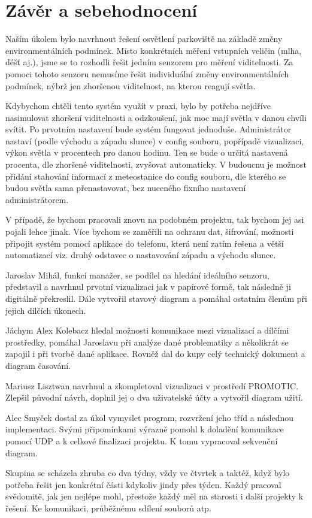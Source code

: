 \chapter{Závěr a sebehodnocení}

Naším úkolem bylo navrhnout řešení osvětlení parkoviště na základě změny environmentálních podmínek. Místo konkrétních měření vstupních veličin (mlha, déšť aj.), jsme se to rozhodli řešit jedním senzorem pro měření viditelnosti. Za pomoci tohoto senzoru nemusíme řešit individuální změny environmentálních podmínek, nýbrž jen zhoršenou viditelnost, na kterou reagují světla. 

Kdybychom chtěli tento systém využít v praxi, bylo by potřeba nejdříve nasimulovat zhoršení viditelnosti a odzkoušení, jak moc mají světla v danou chvíli svítit. Po prvotním nastavení bude systém fungovat jednoduše. Administrátor nastaví (podle východu a západu slunce) v config souboru, popřípadě vizualizaci, výkon světla v procentech pro danou hodinu. Ten se bude o určitá nastavená procenta, dle zhoršené viditelnosti, zvyšovat automaticky. V budoucnu je možnost přidání stahování informací z meteostanice do config souboru, dle kterého se budou světla sama přenastavovat, bez nuceného fixního nastavení administrátorem.

V případě, že bychom pracovali znovu na podobném projektu, tak bychom jej asi pojali lehce jinak. Více bychom se zaměřili na ochranu dat, šifrování, možnosti připojit systém pomocí aplikace do telefonu, která není zatím řešena a větší automatizací viz. druhý odstavec o nastavování západu a východu slunce. 

Jaroslav Mihál, funkcí manažer, se podílel na hledání ideálního senzoru, představil a navrhnul prvotní vizualizaci jak v papírové formě, tak následně ji digitálně překreslil. Dále vytvořil stavový diagram a pomáhal ostatním členům při jejich dílčích úkonech. 

Jáchym Alex Kolebacz hledal možnosti komunikace mezi vizualizací a dílčími prostředky, pomáhal Jaroslavu při analýze dané problematiky a několikrát se zapojil i při tvorbě dané aplikace. Rovněž dal do kupy celý technický dokument a diagram časování.

Mariusz Lisztwan navrhnul a zkompletoval vizualizaci v prostředí PROMOTIC. Zlepšil původní návrh, doplnil jej o dva uživatelské účty a vytvořil diagram užití.

Alec Smyček dostal za úkol vymyslet program, rozvržení jeho tříd a následnou implementaci. Svými připomínkami výrazně pomohl k doladění komunikace pomocí UDP a k celkové finalizaci projektu. K tomu vypracoval sekvenční diagram.

Skupina se scházela zhruba co dva týdny, vždy ve čtvrtek a taktéž, když bylo potřeba řešit jen konkrétní části kdykoliv jindy přes týden. Každý pracoval svědomitě, jak jen nejlépe mohl, přestože každý měl na starosti i další projekty k řešení. Ke komunikaci, průběžnému sdílení souborů atp. 

\endinput